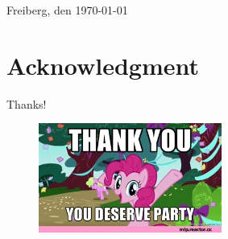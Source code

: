 \documentclass[
	 11pt,         %
	 a4paper,      %
	 oneside,
	 ]{article}
\newcommand{\mydozent}{Prof. Jung}
\newcommand{\mydozentTwo}{Matthias Lenk}
\newcommand{\emptypage}[0]{
	\clearpage
	\thispagestyle{empty}
	\mbox{}
	\newpage
}
\begin{document}
Freiberg, den \today \hspace{2cm} \underline{\phantom{Platz für die Unterschrift}}
\clearpage

\emptypage
\thispagestyle{empty}
\section*{Acknowledgment} %
\label{sec:danksagung}



Thanks!

\begin{figure}[htbp]
	\includegraphics[width=6cm]{../assets/my-little-pony-mlp-other-261396.jpeg}
\end{figure}


\emptypage
\setcounter{tocdepth}{5}
\tableofcontents
\clearpage

\emptypage
{}


\end{document}
